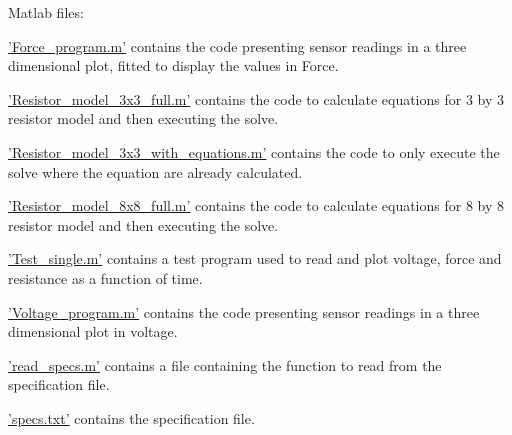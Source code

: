 Matlab files:
    \begin{continuing}
        \item 
        \href{https://github.com/s214413/Force-Displacement-Visualization-through-3D-Printed-Sensor-Grid/blob/main/Matlab/Force_program.m}{'Force\_program.m'}
        contains the code presenting sensor readings in a three dimensional plot, fitted to display the values in Force.
        \item 
        \href{https://github.com/s214413/Force-Displacement-Visualization-through-3D-Printed-Sensor-Grid/blob/main/Matlab/Resistor_model_3x3_full.m}{'Resistor\_model\_3x3\_full.m'} contains the code to calculate equations for 3 by 3 resistor model and then executing the solve.
        \item 
        \href{https://github.com/s214413/Force-Displacement-Visualization-through-3D-Printed-Sensor-Grid/blob/main/Matlab/Resistor_model_3x3_with_equation.m}{'Resistor\_model\_3x3\_with\_equations.m'} contains the code to only execute the solve where the equation are already calculated.
        \item 
        \href{https://github.com/s214413/Force-Displacement-Visualization-through-3D-Printed-Sensor-Grid/blob/main/Matlab/Resistor_model_8x8_full.m}{'Resistor\_model\_8x8\_full.m'} contains the code to calculate equations for 8 by 8 resistor model and then executing the solve.
        \item 
        \href{https://github.com/s214413/Force-Displacement-Visualization-through-3D-Printed-Sensor-Grid/blob/main/Matlab/Test_single.m}{'Test\_single.m'} contains a test program used to read and plot voltage, force and resistance as a function of time.
        \item 
        \href{https://github.com/s214413/Force-Displacement-Visualization-through-3D-Printed-Sensor-Grid/blob/main/Matlab/Voltage_program.m}{'Voltage\_program.m'} contains the code presenting sensor readings in a three dimensional plot in voltage.
        \item 
        \href{https://github.com/s214413/Force-Displacement-Visualization-through-3D-Printed-Sensor-Grid/blob/main/Matlab/read_specs.m}{'read\_specs.m'} contains a file containing the function to read from the specification file.
        \item 
        \href{https://github.com/s214413/Force-Displacement-Visualization-through-3D-Printed-Sensor-Grid/blob/main/Matlab/specs.txt}{'specs.txt'} contains the specification file.
    \end{continuing}
    
